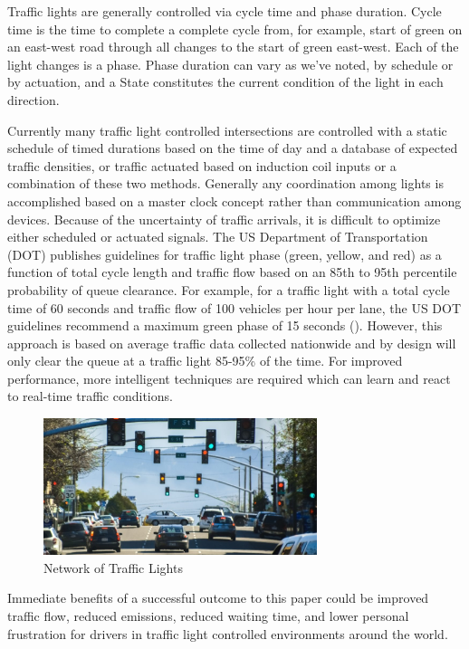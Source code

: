 \documentclass[twocolumn]{article}
\begin{document}
Traffic lights are generally controlled via cycle time and phase duration.  Cycle time is the time to complete a complete cycle from, for example, start of green on an east-west road through all changes to the start of green east-west.  Each of the light changes is a phase.  Phase duration can vary as we've noted, by schedule or by actuation, and a State constitutes the current condition of the light in each direction.

Currently many traffic light controlled intersections are controlled with a static schedule of timed durations based on the time of day and a database of expected traffic densities, or traffic actuated based on induction coil inputs or a combination of these two methods. Generally any coordination among lights is accomplished based on a master clock concept rather than communication among devices. Because of the uncertainty of traffic arrivals, it is difficult to optimize either scheduled or actuated signals.  
The US Department of Transportation (DOT) publishes guidelines for traffic light phase (green, yellow, and red) as a function of total cycle length and traffic flow based on an 85th to 95th percentile probability of queue clearance. For example, for a traffic light with a total cycle time of 60 seconds and traffic flow of 100 vehicles per hour per lane, the US DOT guidelines recommend a maximum green phase of 15 seconds (\cite{USDOT}). However, this approach is based on average traffic data collected nationwide and by design will only clear the queue at a traffic light 85-95\% of the time. For improved performance, more intelligent techniques are required which can learn and react to real-time traffic conditions.

\begin{figure}[htp]
    \centering
    \includegraphics[width=8cm]{figures/traffic_light_network.jpg}
    \caption{Network of Traffic Lights}
    \label{fig:traffic_lights}
\end{figure}

Immediate benefits of a successful outcome to this paper could be improved traffic flow, reduced emissions, reduced waiting time, and lower personal frustration for drivers in traffic light controlled environments around the world.  
\end{document}
